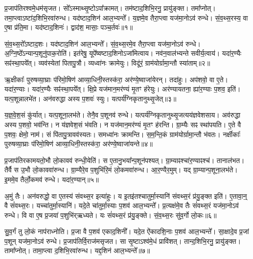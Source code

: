 प्र॒जा\-प॑तिरश्वमे॒धम॑\-सृजत।
सो᳚ऽस्माथ्सृ॒ष्टो\-ऽपा᳚क्रामत्।
तम॑ष्टा\-द॒शिभि॒\-रनु॒\- प्रायु॑ङ्क्त।
तमा᳚प्नोत्।
तमा॒प्त्वा\-ऽष्टा॑द॒शिभि॒रवा॑\-रुन्ध।
यद॑ष्टा\-द॒शिन॑ आल॒भ्यन्ते᳚।
य॒ज्ञमे॒व तैरा॒प्त्वा यज॑मा॒नो\-ऽव॑ रुन्धे।
सं॒व॒थ्स॒\-र\-स्य॒ वा ए॒षा प्र॑ति॒मा।
यद॑ष्टाद॒शिनः॑।
द्वाद॑श॒ मासाः॒ पञ्च॒र्तवः॑॥१॥\ip

सं॒व॒थ्स॒रो᳚\-ऽष्टाद॒शः।
यद॑ष्टाद॒शिन॑ आल॒भ्यन्ते᳚।
सं॒व॒थ्स॒रमे॒व तैरा॒प्त्वा यज॑मा॒नो\-ऽव॑ रुन्धे।
अ॒ग्नि॒ष्ठे᳚\-ऽन्यान्प॒शूनु॑पाक॒रोति॑।
इत॑रेषु॒ यूपे᳚ष्वष्टाद॒शिनो\-ऽजा॑मित्वाय।
नव॑न॒वाल॑भ्यन्ते सवीर्य॒त्वाय॑।
यदा॑र॒ण्यैः सꣴ॑स्था॒पये᳚त्।
व्यव॑स्येतां पितापु॒त्रौ।
व्यध्वा॑नः क्रामेयुः।
विदू॑रं॒ ग्राम॑योर्ग्रामा॒न्तौ स्या॑ताम्॥२॥\ip

ऋ॒क्षीकाः᳚ पुरुषव्या॒घ्राः प॑रिमो॒षिण॑ आव्या॒धिनी॒स्तस्क॑रा॒ अर॑ण्ये॒ष्वाजा॑येरन्।
तदा॑हुः।
अप॑शवो॒ वा ए॒ते।
यदा॑र॒ण्याः।
यदा॑र॒ण्यैः सꣴ॑स्था॒पये᳚त्।
क्षि॒प्रे यज॑मान॒मर॑ण्यं मृ॒तꣳ ह॑रेयुः।
अर॑ण्यायतना॒ ह्या॑र॒ण्याः प॒शव॒ इति॑।
यत्प॒शून्नालभे॑त।
अन॑वरुद्धा अस्य प॒शवः॑ स्युः।
यत्पर्य॑ग्निकृतानुथ्सृ॒जेत्॥३॥\ip

य॒ज्ञ॒वे॒श॒सं कु॑र्यात्।
यत्प॒शूना॒लभ॑ते।
तेनै॒व प॒शूनव॑ रुन्धे।
यत्पर्य॑ग्निकृतानुथ्सृ॒जत्य\-य॑ज्ञ\-वेशसाय।
अव॑रुद्धा अस्य प॒शवो॒ भव॑न्ति।
न य॑ज्ञवेश॒सं भ॑वति।
न यज॑मान॒मर॑ण्यं मृ॒तꣳ ह॑रन्ति।
ग्रा॒म्यैः सꣴ स्था॑पयति।
ए॒ते वै प॒शवः॒ क्षेमो॒ नाम॑।
सं पि॑तापु॒त्रावव॑स्यतः।
समध्वा॑नः क्रामन्ति।
स॒म॒न्ति॒कं ग्राम॑योर्ग्रामा॒न्तौ भ॑वतः।
नर्क्षीकाः᳚ पुरुषव्या॒घ्राः प॑रिमो॒षिण॑ आव्या॒धिनी॒स्तस्क॑रा॒ अर॑ण्ये॒ष्वाजा॑यन्ते॥४॥\ip\anuvakamend[ऋ॒तवः॑ स्यातामुथ्सृ॒जेथ्स्य॑त॒स्त्रीणि॑ च]

प्र॒जा\-प॑तिरकामयतो॒भौ लो॒कावव॑ रुन्धी॒येति॑।
स ए॒ता\-नु॒भया᳚न्प॒शून॑\-पश्यत्।
ग्रा॒म्याꣴश्चा॑\-र॒ण्याꣴश्च॑।
तानाल॑भत।
तैर्वै स उ॒भौ लो॒का\-ववा॑\-रुन्ध।
ग्रा॒म्यैरे॒व प॒शुभि॑रि॒मं लो॒कमवा॑रुन्ध।
आ॒र॒ण्यै\-र॒मुम्।
यद् ग्रा॒म्यान्प॒शूना॒लभ॑ते।
इ॒ममे॒व तैर्लो॒कमव॑ रुन्धे।
यदा॑र॒ण्यान्॥५॥\ip

अ॒मुं तैः।
अन॑वरुद्धो॒ वा ए॒तस्य॑ संवथ्स॒र इत्या॑हुः।
य इ॒तइ॑तश्चातुर्मा॒स्यानि॑ संवथ्स॒रं प्र॑यु॒ङ्क्त इति॑।
ए॒तावा॒न्॒ वै सं॑वथ्स॒रः।
यच्चा॑तुर्मा॒स्यानि॑।
यदे॒ते चा॑तुर्मा॒स्याः प॒शव॑ आल॒भ्यन्ते᳚।
प्र॒त्यक्ष॑मे॒व तैः सं॑वथ्स॒रं यज॑मा॒नो\-ऽव॑ रुन्धे।
वि वा ए॒ष प्र॒जया॑ प॒शुभि॑र्‌\mbox{}ऋध्यते।
यः सं॑वथ्स॒रं प्र॑यु॒ङ्क्ते।
सं॒व॒थ्स॒रः सु॑व॒र्गो लो॒कः॥६॥\ip

सु॒व॒र्गं तु लो॒कं नाप॑राध्नोति।
प्र॒जा वै प॒शव॑ एकाद॒शिनी᳚।
यदे॒त ऐ॑कादशि॒नाः प॒शव॑ आल॒भ्यन्ते᳚।
सा॒क्षादे॒व प्र॒जां प॒शून् यज॑मा॒नो\-ऽव॑ रुन्धे।
प्र॒जा\-प॑तिर्वि॒राज॑म\-सृजत।
सा सृ॒ष्टा\-ऽश्व॑मे॒धं प्रावि॑शत्।
तान्द॒शिभि॒रनु॒\- प्रायु॑ङ्क्त।
तामा᳚प्नोत्।
तामा॒प्त्वा द॒शिभि॒रवा॑रुन्ध।
यद्द॒शिन॑ आल॒भ्यन्ते᳚॥७॥\ip


